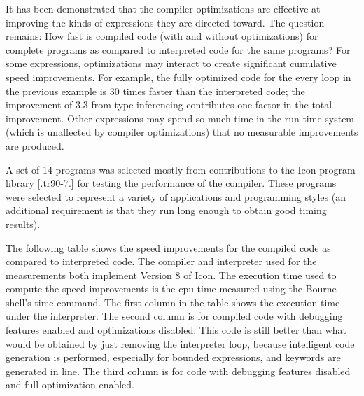 It has been demonstrated that the compiler optimizations are effective
at improving the kinds of expressions they are directed toward. The
question remains: How fast is compiled code (with and without
optimizations) for complete programs as compared to interpreted code
for the same programs? For some expressions, optimizations may
interact to create significant cumulative speed improvements. For
example, the fully optimized code for the every loop in the previous
example is 30 times faster than the interpreted code; the improvement
of 3.3 from type inferencing contributes one factor in the total
improvement. Other expressions may spend so much time in the run-time
system (which is unaffected by compiler optimizations) that no
measurable improvements are produced.

A set of 14 programs was selected mostly from contributions to the
Icon program library [.tr90-7.] for testing the performance of the
compiler. These programs were selected to represent a variety of
applications and programming styles (an additional requirement is that
they run long enough to obtain good timing results).

The following table shows the speed improvements for the compiled code
as compared to interpreted code. The compiler and interpreter used for
the measurements both implement Version 8 of Icon. The execution time
used to compute the speed improvements is the cpu time measured using
the Bourne shell's time command. The first column in the table shows
the execution time under the interpreter. The second column is for
compiled code with debugging features enabled and optimizations
disabled. This code is still better than what would be obtained by
just removing the interpreter loop, because intelligent code
generation is performed, especially for bounded expressions, and
keywords are generated in line. The third column is for code with
debugging features disabled and full optimization enabled.

